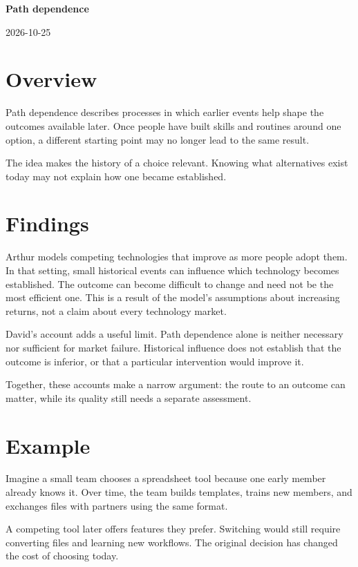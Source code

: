 \documentclass[11pt,a4paper]{article}
\newcommand{\researchtitle}{Path dependence}
\newcommand{\researchdate}{2026-10-25}
\begin{document}
{\LARGE\bfseries\researchtitle\par}
\vspace{0.4em}
{\small\researchdate\par}

\section{Overview}

Path dependence describes processes in which earlier events help shape
the outcomes available later. Once people have built skills and routines
around one option, a different starting point may no longer lead to the
same result. \cite{arthur,david}

The idea makes the history of a choice relevant. Knowing what alternatives
exist today may not explain how one became established.

\section{Findings}

Arthur models competing technologies that improve as more people adopt
them. In that setting, small historical events can influence which
technology becomes established. The outcome can become difficult to
change and need not be the most efficient one. This is a result of the
model's assumptions about increasing returns, not a claim about every
technology market. \cite{arthur}

David's account adds a useful limit. Path dependence alone is neither
necessary nor sufficient for market failure. Historical influence does
not establish that the outcome is inferior, or that a particular
intervention would improve it. \cite{david}

Together, these accounts make a narrow argument: the route to an outcome
can matter, while its quality still needs a separate assessment.

\section{Example}

Imagine a small team chooses a spreadsheet tool because one early member
already knows it. Over time, the team builds templates, trains new members,
and exchanges files with partners using the same format.

A competing tool later offers features they prefer. Switching would still
require converting files and learning new workflows. The original
decision has changed the cost of choosing today.
\end{document}
